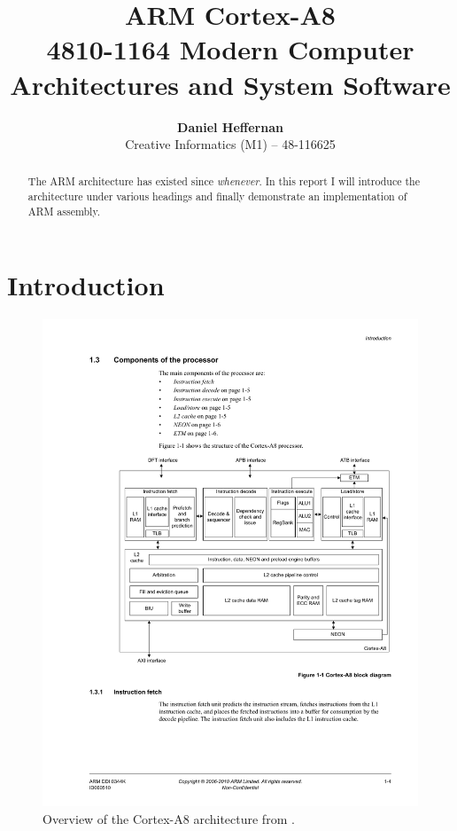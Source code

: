 \documentclass[oneside,a4paper]{article}
\title{ \textbf{ARM Cortex-A8} \\ \large{4810-1164 Modern Computer Architectures and System Software}}
\author{ \textbf{Daniel Heffernan} \\ Creative Informatics (M1) -- 48-116625 }
\begin{document}
\ifpdf
{}
\else
{}
\fi

\maketitle


\begin{abstract}
    The ARM architecture has existed since \emph{whenever}. In this report I will introduce the architecture under various headings and finally demonstrate an implementation of ARM assembly.
\end{abstract}

\section{Introduction}

\begin{figure}[h]
	\centering
	\includegraphics{./fig/CortexA8.pdf}
	\caption{Overview of the Cortex-A8 architecture from \cite[p. 1-4]{A8Ref}.}
	\label{fig:cortexa8}
\end{figure}
\end{document}

